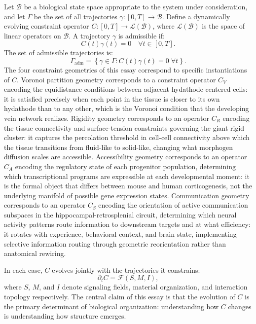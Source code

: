 \documentclass[12pt, a4paper, openany]{book}
\theoremstyle{definition}
\theoremstyle{remark}
\begin{document}
Let $\mathcal{B}$ be a biological state space appropriate to the system under consideration, and let $\Gamma$ be the set of all trajectories $\gamma : [0,T] \to \mathcal{B}$. Define a dynamically evolving constraint operator $C : [0,T] \to \mathcal{L}(\mathcal{B})$, where $\mathcal{L}(\mathcal{B})$ is the space of linear operators on $\mathcal{B}$. A trajectory $\gamma$ is admissible if:
\begin{equation}
C(t)\gamma(t) = 0 \quad \forall t \in [0,T].
\end{equation}
The set of admissible trajectories is:
\begin{equation}
\Gamma_{\text{adm}} = \left\{ \gamma \in \Gamma : C(t)\gamma(t) = 0 \;\forall t \right\}.
\end{equation}
The four constraint geometries of this essay correspond to specific instantiations of $C$. Voronoi partition geometry corresponds to a constraint operator $C_V$ encoding the equidistance conditions between adjacent hydathode-centered cells: it is satisfied precisely when each point in the tissue is closer to its own hydathode than to any other, which is the Voronoi condition that the developing vein network realizes. Rigidity geometry corresponds to an operator $C_R$ encoding the tissue connectivity and surface-tension constraints governing the giant rigid cluster: it captures the percolation threshold in cell-cell connectivity above which the tissue transitions from fluid-like to solid-like, changing what morphogen diffusion scales are accessible. Accessibility geometry corresponds to an operator $C_A$ encoding the regulatory state of each progenitor population, determining which transcriptional programs are expressible at each developmental moment: it is the formal object that differs between mouse and human corticogenesis, not the underlying manifold of possible gene expression states. Communication geometry corresponds to an operator $C_S$ encoding the orientation of active communication subspaces in the hippocampal-retrosplenial circuit, determining which neural activity patterns route information to downstream targets and at what efficiency: it rotates with experience, behavioral context, and brain state, implementing selective information routing through geometric reorientation rather than anatomical rewiring.

In each case, $C$ evolves jointly with the trajectories it constrains:
\begin{equation}
\partial_t C = \mathcal{F}(S, M, I),
\end{equation}
where $S$, $M$, and $I$ denote signaling fields, material organization, and interaction topology respectively. The central claim of this essay is that the evolution of $C$ is the primary determinant of biological organization: understanding how $C$ changes is understanding how structure emerges.
\end{document}
